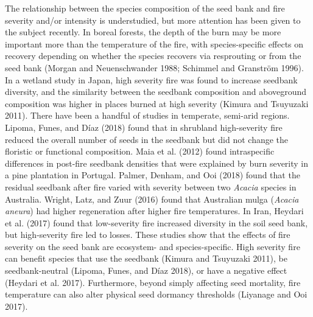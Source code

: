 \documentclass[
  12pt,
]{article}
\begin{document}
The relationship between the species composition of the seed bank and
fire severity and/or intensity is understudied, but more attention has
been given to the subject recently. In boreal forests, the depth of the
burn may be more important more than the temperature of the fire, with
species-specific effects on recovery depending on whether the species
recovers via resprouting or from the seed bank (Morgan and
Neuenschwander 1988; Schimmel and Granström 1996). In a wetland study in
Japan, high severity fire was found to increase seedbank diversity, and
the similarity between the seedbank composition and aboveground
composition was higher in places burned at high severity (Kimura and
Tsuyuzaki 2011). There have been a handful of studies in temperate,
semi-arid regions. Lipoma, Funes, and Díaz (2018) found that in
shrubland high-severity fire reduced the overall number of seeds in the
seedbank but did not change the floristic or functional composition.
Maia et al. (2012) found intraspecific differences in post-fire seedbank
densities that were explained by burn severity in a pine plantation in
Portugal. Palmer, Denham, and Ooi (2018) found that the residual
seedbank after fire varied with severity between two \emph{Acacia}
species in Australia. Wright, Latz, and Zuur (2016) found that
Australian mulga (\emph{Acacia aneura}) had higher regeneration after
higher fire temperatures. In Iran, Heydari et al. (2017) found that
low-severity fire increased diversity in the soil seed bank, but
high-severity fire led to losses. These studies show that the effects of
fire severity on the seed bank are ecosystem- and species-specific. High
severity fire can benefit species that use the seedbank (Kimura and
Tsuyuzaki 2011), be seedbank-neutral (Lipoma, Funes, and Díaz 2018), or
have a negative effect (Heydari et al. 2017). Furthermore, beyond simply
affecting seed mortality, fire temperature can also alter physical seed
dormancy thresholds (Liyanage and Ooi 2017).
\end{document}
